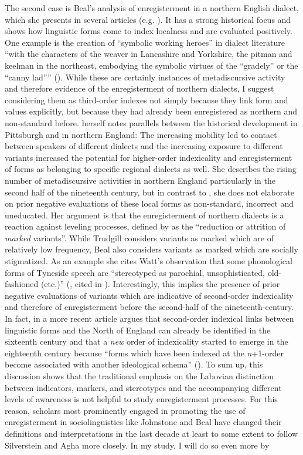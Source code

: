 The second case is Beal’s analysis of enregisterment in a northern English dialect, which she presents in several articles (e.g. \citeyear{Beal2009, Beal2012, Beal2017}). It has a strong historical focus and shows how linguistic forms come to index localness and are evaluated positively. One example is the creation of “symbolic working heroes” in dialect literature “with the characters of the weaver in Lancashire and Yorkshire, the pitman and keelman in the northeast, embodying the symbolic virtues of the “gradely” or the “canny lad”” (\citeyear[136]{Beal2012}). While these are certainly instances of metadiscursive activity and therefore evidence of the enregisterment of northern dialects, I suggest considering them as third-order indexes not simply because they link form and values explicitly, but because they had already been enregistered as northern and non-standard before. \citet[137]{Beal2012} herself notes parallels between the historical development in Pittsburgh and in northern England: The increasing mobility led to contact between speakers of different dialects and the increasing exposure to different variants increased the potential for higher-order indexicality and enregisterment of forms as belonging to specific regional dialects as well. She describes the rising number of metadiscursive activities in northern England particularly in the second half of the nineteenth century, but in contrast to \citet{Johnstone2006}, she does not elaborate on prior negative evaluations of these local forms as non-standard, incorrect and uneducated. Her argument is that the enregisterment of northern dialects is a reaction against leveling processes, defined by \citet[98]{Trudgill1986} as the “reduction or attrition of \emph{marked} variants”. While Trudgill considers variants as marked which are of relatively low frequency, Beal also considers variants as marked which are socially stigmatized. As an example she cites Watt’s observation that some phonological forms of Tyneside speech are “stereotyped as parochial, unsophisticated, old-fashioned (etc.)” (\citeyear[55]{Watt2002}, cited in \citealt[127]{Beal2012}). Interestingly, this implies the presence of prior negative evaluations of variants which are indicative of second-order indexicality and therefore of enregisterment before the second-half of the nineteenth-century. In fact, in a more recent article \citet{Beal2017} argues that second-order indexical links between linguistic forms and the North of England can already be identified in the sixteenth century and that a \textit{new} order of indexicality started to emerge in the eighteenth century because “forms which have been indexed at the \textit{n}+1-order become associated with another ideological schema” (\citeyear[28]{Beal2017}). To sum up, this discussion shows that the traditional emphasis on the Labovian distinction between indicators, markers, and stereotypes and the accompanying different levels of awareness is not helpful to study enregisterment processes. For this reason, scholars most prominently engaged in promoting the use of enregisterment in sociolinguistics like Johnstone and Beal have changed their definitions and interpretations in the last decade at least to some extent to follow Silverstein and Agha more closely. In my study, I will do so even more by 
